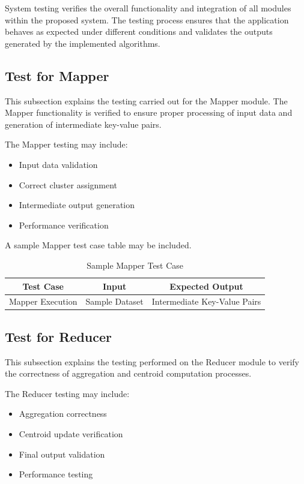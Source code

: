 System testing verifies the overall functionality and integration of all modules within the proposed system. The testing process ensures that the application behaves as expected under different conditions and validates the outputs generated by the implemented algorithms.


\subsection{Test for Mapper}

This subsection explains the testing carried out for the Mapper module. The Mapper functionality is verified to ensure proper processing of input data and generation of intermediate key-value pairs.

The Mapper testing may include:
\begin{itemize}
    \item Input data validation
    \item Correct cluster assignment
    \item Intermediate output generation
    \item Performance verification
\end{itemize}

A sample Mapper test case table may be included.

\begin{table}[htb]
\centering
\caption{Sample Mapper Test Case}
\label{tab:mapper_testcase}
\begin{tabular}{|c|c|c|}
\hline
\textbf{Test Case} & \textbf{Input} & \textbf{Expected Output} \\
\hline
Mapper Execution & Sample Dataset & Intermediate Key-Value Pairs \\
\hline
\end{tabular}
\end{table}


\subsection{Test for Reducer}

This subsection explains the testing performed on the Reducer module to verify the correctness of aggregation and centroid computation processes.

The Reducer testing may include:
\begin{itemize}
    \item Aggregation correctness
    \item Centroid update verification
    \item Final output validation
    \item Performance testing
\end{itemize}


